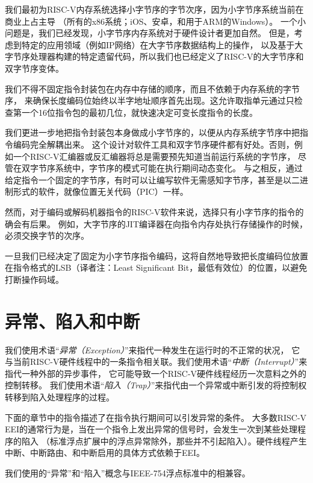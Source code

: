 \begin{commentary}

我们最初为RISC-V内存系统选择小字节序的字节次序，因为小字节序系统当前在商业上占主导
（所有的x86系统；iOS、安卓，和用于ARM的Windows）。
一个小问题是，我们已经发现，小字节序内存系统对于硬件设计者更加自然。
但是，考虑到特定的应用领域（例如IP网络）在大字节序数据结构上的操作，
以及基于大字节序处理器构建的特定遗留代码，所以我们也已经定义了RISC-V的大字节序和双字节序变体。

我们不得不固定指令封装包在内存中存储的顺序，而且不依赖于内存系统的字节序，
来确保长度编码位始终以半字地址顺序首先出现。这允许取指单元通过只检查第一个16位指令包的最初几位，就快速决定可变长度指令的长度。

我们更进一步地把指令封装包本身做成小字节序的，以便从内存系统字节序中把指令编码完全解耦出来。
这个设计对软件工具和双字节序硬件都有好处。否则，例如一个RISC-V汇编器或反汇编器将总是需要预先知道当前运行系统的字节序，
尽管在双字节序系统中，字节序的模式可能在执行期间动态变化。
与之相反，通过给定指令一个固定的字节序，有时可以让编写软件无需感知字节序，甚至是以二进制形式的软件，就像位置无关代码（PIC）一样。

然而，对于编码或解码机器指令的RISC-V软件来说，选择只有小字节序的指令的确会有后果。
例如，大字节序的JIT编译器在向指令内存处执行存储操作的时候，必须交换字节的次序。

一旦我们已经决定了固定为小字节序指令编码，这将自然地导致把长度编码位放置在指令格式的LSB（译者注：Least Significant Bit，最低有效位）的位置，以避免打断操作码域。
\end{commentary}

\section{异常、陷入和中断}
\label{sec:trap-defn}

我们使用术语“{\em 异常（Exception）}”来指代一种发生在运行时的不正常的状况，
它与当前RISC-V硬件线程中的一条指令相关联。我们使用术语“{\em 中断（Interrupt）}”来指代一种外部的异步事件，
它可能导致一个RISC-V硬件线程经历一次意料之外的控制转移。
我们使用术语“{\em 陷入（Trap）}”来指代由一个异常或中断引发的将控制权转移到陷入处理程序的过程。

下面的章节中的指令描述了在指令执行期间可以引发异常的条件。
大多数RISC-V EEI的通常行为是，当在一个指令上发出异常的信号时，会发生一次到某些处理程序的陷入
（标准浮点扩展中的浮点异常除外，那些并不引起陷入）。硬件线程产生中断、中断路由、和中断启用的具体方式依赖于EEI。


\begin{commentary}
  
  我们使用的“异常”和“陷入”概念与IEEE-754浮点标准中的相兼容。
\end{commentary}

